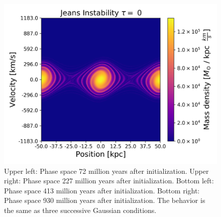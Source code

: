 \begin{figure}[h!]
    \includegraphics[scale=0.45]{imag/jeans90.png}
    \caption{Upper left: Phase space 72 million years after initialization. Upper right: Phase space 227 million years after initialization. Bottom left: Phase space 413 million years after initialization. Bottom right: Phase space 930 million years after initialization. The behavior is the same as three successive Gaussian conditions.}
    \label{1dJeans}
\end{figure}


